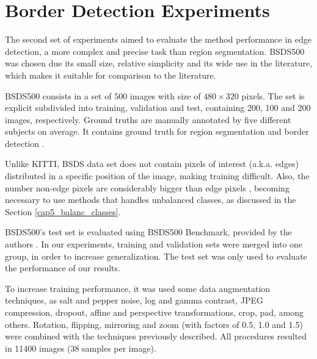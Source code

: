 \section{Border Detection Experiments}
\label{cap6_result_experm_2}

The second set of experiments aimed to evaluate the method performance  in edge detection, a more complex and precise task than region segmentation.
BSDS500 was chosen due its small size, relative simplicity and its wide use in the literature, which makes it suitable for comparison to the literature.

BSDS500 consists in a set of 500 images with size of $480 \times 320$ pixels. %
The set is explicit subdivided into training, validation and test, containing 200, 100 and 200 images, respectively.
Ground truths are manually annotated by five different subjects on average. 
It contains ground truth for region segmentation and border detection \cite{amfm_pami2011}.

Unlike KITTI, BSDS data set does not contain pixels of interest (a.k.a. edges) distributed in a specific position of the image, making training difficult.
Also, the number non-edge pixels are considerably bigger than edge pixels \cite{ReExtraction:Wen201884}, becoming necessary to use methods that handles unbalanced classes, as discussed in the Section \ref{cap5_balanc_classes}.


BSDS500's test set is evaluated using BSDS500 Benchmark, provided by the authors \cite{amfm_pami2011}.
In our experiments, training and validation sets were merged into one group, in order to increase generalization.
The test set was only used to evaluate the performance of our results.

To increase training performance, it was used some data augmentation techniques, as salt and pepper noise, log and gamma contrast, JPEG compression, dropout, affine and perspective transformations, crop, pad, among others.
Rotation, flipping, mirroring and zoom (with factors of 0.5, 1.0 and 1.5) were combined with the techniques previously described.
All procedures resulted in 11400 images (38 samples per image).%

